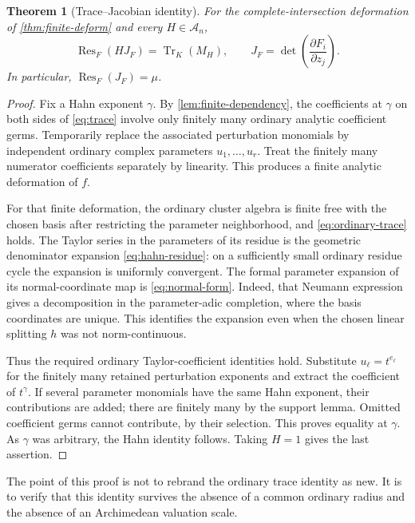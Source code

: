 \documentclass[11pt,letterpaper]{article}
\newtheorem{theorem}{Theorem}[section]
\theoremstyle{definition}
\theoremstyle{remark}
\newcommand{\A}{\mathscr A}
\newcommand{\Res}{\operatorname{Res}}
\newcommand{\Tr}{\operatorname{Tr}}
\numberwithin{equation}{section}
\begin{document}
\begin{theorem}[Trace--Jacobian identity]\label{thm:trace}
For the complete-intersection deformation of \cref{thm:finite-deform} and every $H\in\A_n$,
\begin{equation}\label{eq:trace}
 \boxed{\qquad \Res_F(HJ_F)=\Tr_K(M_H),\qquad
 J_F=\det\left(\frac{\partial F_i}{\partial z_j}\right).\qquad}
\end{equation}
In particular, $\Res_F(J_F)=\mu$.
\end{theorem}
\begin{proof}
Fix a Hahn exponent $\gamma$. By \cref{lem:finite-dependency}, the coefficients at $\gamma$ on both sides of \eqref{eq:trace} involve only finitely many ordinary analytic coefficient germs. Temporarily replace the associated perturbation monomials by independent ordinary complex parameters $u_1,\ldots,u_r$. Treat the finitely many numerator coefficients separately by linearity. This produces a finite analytic deformation of $f$.

For that finite deformation, the ordinary cluster algebra is finite free with the chosen basis after restricting the parameter neighborhood, and \eqref{eq:ordinary-trace} holds. The Taylor series in the parameters of its residue is the geometric denominator expansion \eqref{eq:hahn-residue}: on a sufficiently small ordinary residue cycle the expansion is uniformly convergent. The formal parameter expansion of its normal-coordinate map is \eqref{eq:normal-form}. Indeed, that Neumann expression gives a decomposition in the parameter-adic completion, where the basis coordinates are unique. This identifies the expansion even when the chosen linear splitting $h$ was not norm-continuous.

Thus the required ordinary Taylor-coefficient identities hold. Substitute $u_\ell=t^{e_\ell}$ for the finitely many retained perturbation exponents and extract the coefficient of $t^\gamma$. If several parameter monomials have the same Hahn exponent, their contributions are added; there are finitely many by the support lemma. Omitted coefficient germs cannot contribute, by their selection. This proves equality at $\gamma$. As $\gamma$ was arbitrary, the Hahn identity follows. Taking $H=1$ gives the last assertion.
\end{proof}

The point of this proof is not to rebrand the ordinary trace identity as new. It is to verify that this identity survives the absence of a common ordinary radius and the absence of an Archimedean valuation scale.
\end{document}
